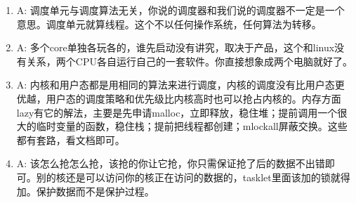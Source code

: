 \begin{enumerate}
  \item
\begin{tcolorbox}[colback=green!5,colframe=green!75!black]
\tcblower
A: 调度单元与调度算法无关，你说的调度器和我们说的调度器不一定是一个意思。调度单元就算线程。这个不以任何操作系统，任何算法为转移。
\end{tcolorbox}


  \item
\begin{tcolorbox}[colback=green!5,colframe=green!75!black]
\tcblower
A: 多个core单独各玩各的，谁先启动没有讲究，取决于产品，这个和linux没有关系，两个CPU各自运行自己的一套软件。你直接想象成两个电脑就好了。
\end{tcolorbox}



  \item
\begin{tcolorbox}[colback=green!5,colframe=green!75!black]
\tcblower
A: 内核和用户态都是用相同的算法来进行调度，内核的调度没有比用户态更优越，用户态的调度策略和优先级比内核高时也可以抢占内核的。内存方面lazy有它的解法，主要是先申请malloc，立即释放，稳住堆；提前调用一个很大的临时变量的函数，稳住栈；提前把线程都创建；mlockall屏蔽交换。这些都有套路，看文档即可。
\end{tcolorbox}



  \item
\begin{tcolorbox}[colback=green!5,colframe=green!75!black]
\tcblower
A: 该怎么抢怎么抢，该抢的你让它抢，你只需保证抢了后的数据不出错即可。别的核还是可以访问你的核正在访问的数据的，tasklet里面该加的锁就得加。保护数据而不是保护过程。
\end{tcolorbox}
\end{enumerate}

